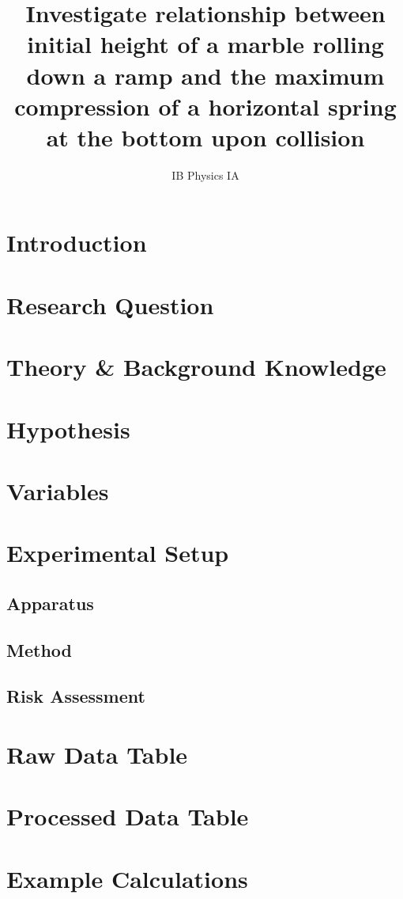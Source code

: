 \documentclass[11pt]{article}
\title{Investigate relationship between initial height of a marble rolling down
a ramp and the maximum compression of a horizontal spring at the bottom
upon collision}
\date{IB Physics IA}
\begin{document}
    \maketitle
    \newpage
    \tableofcontents
    \newpage
    \section{Introduction}
    
    \section{Research Question}    
    
    \section{Theory \& Background Knowledge}
    
    \section{Hypothesis}
    
    \section{Variables}
    
    \section{Experimental Setup}
    
        \subsection{Apparatus}
        
        \subsection{Method}
        
        \subsection{Risk Assessment}
        
    \section{Raw Data Table}
    
    \section{Processed Data Table}
    
    \section{Example Calculations}
    
\end{document}
